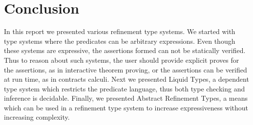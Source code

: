 \section{Conclusion}
In this report we presented various refinement type systems.
We started with type systems where the predicates can be arbitrary expressions.
Even though these systems are expressive, the assertions formed can not be statically
verified. Thus to reason about such systems, the user should provide explicit proves
for the assertions, as in interactive theorem proving, 
or the assertions can be verified at run time, as in contracts calculi.
Next we presented Liquid Types, a dependent type system 
which restricts the predicate language, thus both type checking and inference
is decidable.
Finally, we presented Abstract Refinement Types, a means which can be used
in a refinement type system to increase expressiveness without increasing complexity.